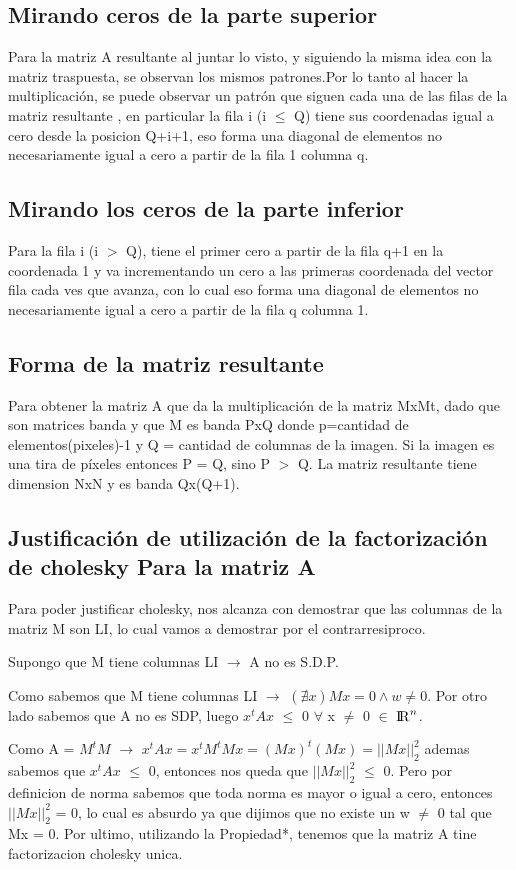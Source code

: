 \subsection{Mirando ceros de la parte superior} 
Para la matriz A resultante al juntar lo visto, y siguiendo la misma idea con la matriz traspuesta, se observan los mismos patrones.Por lo tanto al hacer la multiplicación, se puede observar un patrón que siguen cada una de las filas de la matriz resultante , en particular la fila i (i $\leq$ Q) tiene sus coordenadas igual a cero desde la posicion Q+i+1, eso forma una diagonal de elementos no necesariamente igual a cero a partir de la fila 1 columna q.

\subsection{Mirando los ceros de la parte inferior} 
Para la fila i (i $>$ Q), tiene el primer cero a partir de la fila q+1 en la coordenada 1  y va incrementando un cero a las primeras coordenada del vector fila cada ves que avanza, con lo cual eso forma una diagonal de elementos no necesariamente igual a cero a partir de la fila q columna 1.

\subsection{Forma de la matriz resultante}
Para obtener la matriz A que da la multiplicación de la matriz MxMt, dado que son matrices banda y que M es banda PxQ donde p=cantidad de elementos(pixeles)-1 y Q = cantidad de columnas de la imagen. Si la imagen es una tira de píxeles entonces P = Q, sino P $>$ Q.
La matriz resultante tiene dimension NxN y es banda Qx(Q+1). 

\subsection{Justificación de utilización de la factorización de cholesky Para la matriz A}

Para poder justificar cholesky, nos alcanza con demostrar que las columnas de la matriz M son LI, lo cual vamos a demostrar por el contrarresiproco.\par
\indent Supongo que M tiene columnas LI $\rightarrow$ A no es S.D.P. \par 
\indent Como sabemos que M tiene columnas LI $\rightarrow$ $(\nexists x ) Mx = 0 \land w \neq 0 $. Por otro lado sabemos que A no es SDP, luego $x^{t}Ax$ $\leq$ 0 $\forall$ x $\neq$ 0 $\in$ ${\rm I\!R}^{n}$.\par Como A = $M^{t}M$ $\rightarrow$ $x^{t}Ax = x^{t}M^{t}Mx = (Mx)^{t}(Mx) = ||Mx||_{2}^{2}$ ademas sabemos que $x^{t}Ax$ $\leq$ 0, entonces nos queda que $||Mx||_{2}^{2}$ $\leq$ 0. Pero por definicion de norma sabemos que toda norma es mayor o igual a cero, entonces $||Mx||_{2}^{2}$ = 0, lo cual es absurdo ya que dijimos que no existe un w $\neq$ 0 tal que Mx = 0. Por ultimo, utilizando la Propiedad*, tenemos que la matriz A tine factorizacion cholesky unica.

